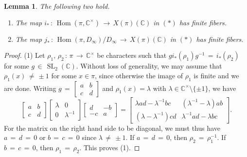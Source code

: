\documentclass[reqno]{amsart}
\theoremstyle{plain}
\newtheorem{lemma}[theorem]{Lemma}
\theoremstyle{definition}
\theoremstyle{remark}
\newcommand{\C}{{\mathbb{C}}}
\DeclareMathOperator{\Hom}{Hom}
\DeclareMathOperator{\SL}{SL}
\begin{document}
\begin{lemma}
\label{ffib}
The following two hold.
\begin{enumerate}
\item The map $i_*\,:\,\Hom(\pi,\C^\times)\,\to\, X(\pi)(\C)$ in $(*)$ has finite fibers.
\item The map $j_*\,:\,\Hom(\pi,D_\infty)/D_\infty\,\to\, X(\pi)(\C)$ in $(*)$ has finite fibers.
\end{enumerate}
\end{lemma}

\begin{proof}
(1) Let $\rho_1,\,\rho_2\,:\,\pi\,\to\,\C^\times$ be characters such that $gi_*(\rho_1)g^{-1}\,=\,i_*(\rho_2)$ for
some $g\,\in\,\SL_2(\C)$. Without  loss of generality, we may assume
that $\rho_1(x)\,\neq\,\pm1$ for some $x\in\pi$, since otherwise the image of $\rho_1$
is finite and we are done. Writing $g\,=\,\left[\begin{smallmatrix}a & b\\ c &d\end{smallmatrix}\right]$ and $\rho_1(x)=\lambda$ with $\lambda\in\C^\times\setminus\{\pm1\}$, we have
$$\begin{bmatrix}a &b\\ c &d\end{bmatrix}\begin{bmatrix}\lambda & 0\\0 & \lambda^{-1}\end{bmatrix}\begin{bmatrix}d &-b\\ -c &a\end{bmatrix}=\begin{bmatrix}\lambda ad-\lambda^{-1}bc & (\lambda^{-1}-\lambda)ab\\(\lambda-\lambda^{-1})cd&\lambda^{-1}ad-\lambda bc\end{bmatrix}.$$
For the matrix on the right hand side to be diagonal, we must thus have $a\,=\,d\,=\,0$ or $b\,=\,c\,=\,0$
since $\lambda\,\neq\,\pm1$. If $a\,=\,d\,=\,0$, then $\rho_2\,=\,\rho_1^{-1}$. If $b\,=\,c\,=\,0$, then
$\rho_1\,=\,\rho_2$. This proves (1).


\end{proof}
\end{document}
